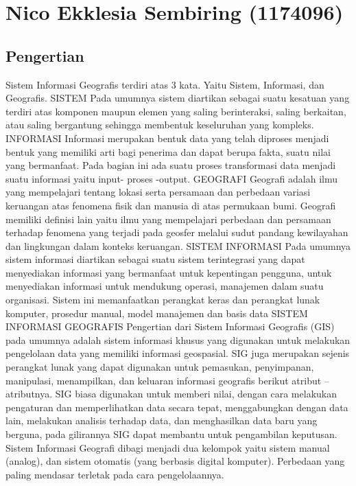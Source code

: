 \section{Nico Ekklesia Sembiring (1174096)}
\subsection{Pengertian}
Sistem Informasi Geografis terdiri atas 3 kata. Yaitu Sistem, Informasi, dan Geografis. \hfill\break
SISTEM\hfill\break
Pada umumnya sistem diartikan sebagai suatu kesatuan yang terdiri atas komponen maupun elemen yang saling berinteraksi, saling berkaitan, atau saling bergantung sehingga membentuk keseluruhan yang kompleks.\hfill\break
INFORMASI\hfill\break
Informasi merupakan bentuk data yang telah diproses menjadi bentuk yang memiliki arti bagi penerima dan dapat berupa fakta, suatu nilai yang bermanfaat. Pada bagian ini ada suatu proses transformasi data menjadi suatu informasi yaitu input- proses -output.\hfill\break
GEOGRAFI\hfill\break
Geografi adalah ilmu yang mempelajari tentang lokasi serta persamaan dan perbedaan variasi keruangan atas fenomena fisik dan manusia di atas permukaan bumi. Geografi memiliki definisi lain yaitu ilmu yang mempelajari perbedaan dan persamaan terhadap fenomena yang terjadi pada geosfer melalui sudut pandang kewilayahan dan lingkungan dalam konteks keruangan.\hfill\break
SISTEM INFORMASI\hfill\break
Pada umumnya sistem informasi diartikan sebagai suatu sistem terintegrasi yang dapat menyediakan informasi yang bermanfaat untuk kepentingan pengguna, untuk menyediakan informasi untuk mendukung operasi, manajemen dalam suatu organisasi. Sistem ini memanfaatkan perangkat keras dan perangkat lunak komputer, prosedur manual, model manajemen dan basis data\hfill\break
SISTEM INFORMASI GEOGRAFIS\hfill\break
Pengertian dari Sistem Informasi Geografis (GIS) pada umumnya adalah sistem informasi khusus yang digunakan untuk melakukan pengelolaan data yang memiliki informasi geospasial. SIG juga merupakan sejenis perangkat lunak yang dapat digunakan untuk pemasukan, penyimpanan, manipulasi, menampilkan, dan keluaran informasi geografis berikut atribut – atributnya. SIG biasa digunakan untuk memberi nilai, dengan cara melakukan pengaturan dan memperlihatkan data secara tepat, menggabungkan dengan data lain, melakukan analisis terhadap data, dan menghasilkan data baru yang berguna, pada gilirannya SIG dapat membantu untuk pengambilan keputusan. Sistem Informasi Geografi dibagi menjadi dua kelompok yaitu sistem manual (analog), dan sistem otomatis (yang berbasis digital komputer). Perbedaan yang paling mendasar terletak pada cara pengelolaannya.\hfill\break

